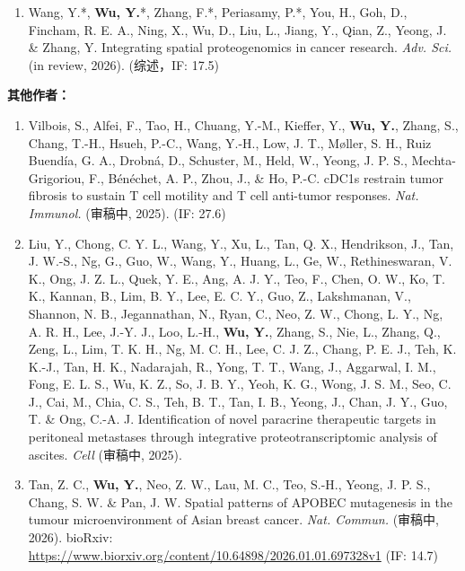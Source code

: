 \documentclass[11pt,a4paper]{article}
\newcommand{\urltext}[1]{\href{#1}{#1}}
\begin{document}
\begin{enumerate}[leftmargin=*,nosep,resume]
\item Wang, Y.*, \textbf{Wu, Y.}*, Zhang, F.*, Periasamy, P.*, You, H., Goh, D., Fincham, R. E. A., Ning, X., Wu, D., Liu, L., Jiang, Y., Qian, Z., Yeong, J. \& Zhang, Y. Integrating spatial proteogenomics in cancer research. \textit{Adv. Sci.} (in review, 2026). (综述，IF: 17.5)
\end{enumerate}

\textbf{其他作者：}

\begin{enumerate}[leftmargin=*,nosep,resume]
\item Vilbois, S., Alfei, F., Tao, H., Chuang, Y.-M., Kieffer, Y., \textbf{Wu, Y.}, Zhang, S., Chang, T.-H., Hsueh, P.-C., Wang, Y.-H., Low, J. T., Møller, S. H., Ruiz Buendía, G. A., Drobná, D., Schuster, M., Held, W., Yeong, J. P. S., Mechta-Grigoriou, F., Bénéchet, A. P., Zhou, J., \& Ho, P.-C. cDC1s restrain tumor fibrosis to sustain T cell motility and T cell anti-tumor responses. \textit{Nat. Immunol.} (审稿中, 2025). (IF: 27.6)

\item Liu, Y., Chong, C. Y. L., Wang, Y., Xu, L., Tan, Q. X., Hendrikson, J., Tan, J. W.-S., Ng, G., Guo, W., Wang, Y., Huang, L., Ge, W., Rethineswaran, V. K., Ong, J. Z. L., Quek, Y. E., Ang, A. J. Y., Teo, F., Chen, O. W., Ko, T. K., Kannan, B., Lim, B. Y., Lee, E. C. Y., Guo, Z., Lakshmanan, V., Shannon, N. B., Jegannathan, N., Ryan, C., Neo, Z. W., Chong, L. Y., Ng, A. R. H., Lee, J.-Y. J., Loo, L.-H., \textbf{Wu, Y.}, Zhang, S., Nie, L., Zhang, Q., Zeng, L., Lim, T. K. H., Ng, M. C. H., Lee, C. J. Z., Chang, P. E. J., Teh, K. K.-J., Tan, H. K., Nadarajah, R., Yong, T. T., Wang, J., Aggarwal, I. M., Fong, E. L. S., Wu, K. Z., So, J. B. Y., Yeoh, K. G., Wong, J. S. M., Seo, C. J., Cai, M., Chia, C. S., Teh, B. T., Tan, I. B., Yeong, J., Chan, J. Y., Guo, T. \& Ong, C.-A. J. Identification of novel paracrine therapeutic targets in peritoneal metastases through integrative proteotranscriptomic analysis of ascites. \textit{Cell} (审稿中, 2025).

\item Tan, Z. C., \textbf{Wu, Y.}, Neo, Z. W., Lau, M. C., Teo, S.-H., Yeong, J. P. S., Chang, S. W. \& Pan, J. W. Spatial patterns of APOBEC mutagenesis in the tumour microenvironment of Asian breast cancer. \textit{Nat. Commun.} (审稿中, 2026). bioRxiv: \urltext{https://www.biorxiv.org/content/10.64898/2026.01.01.697328v1} (IF: 14.7)


\end{enumerate}
\end{document}
